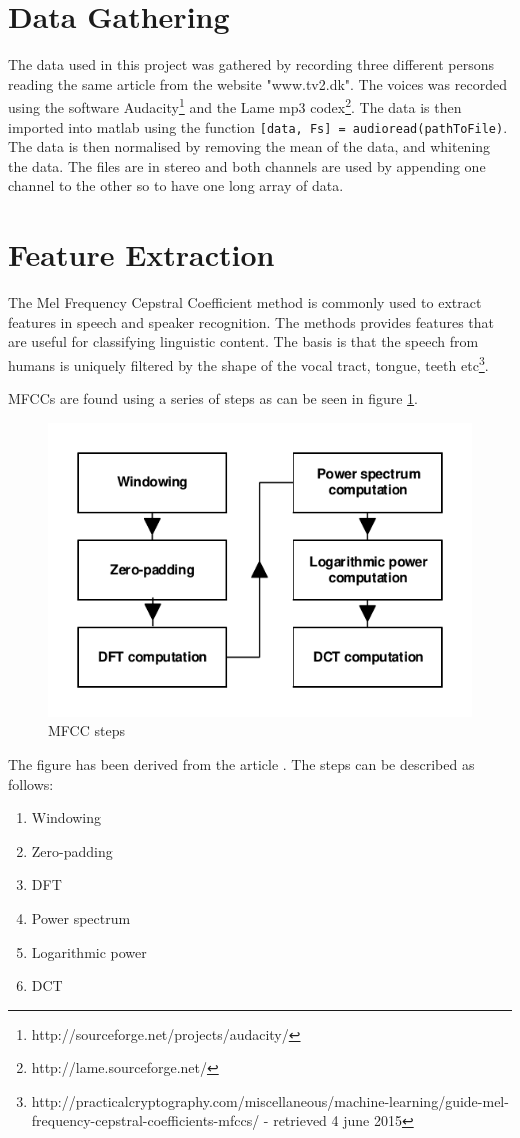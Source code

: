 \section{Data Gathering}
The data used in this project was gathered by recording three different persons reading the same article from the website "www.tv2.dk". The voices was recorded using the software Audacity\footnote{http://sourceforge.net/projects/audacity/} and the Lame mp3 codex\footnote{http://lame.sourceforge.net/}. The data is then imported into matlab using the function \texttt{[data, Fs] = audioread(pathToFile)}. The data is then normalised by removing the mean of the data, and whitening the data. The files are in stereo and both channels are used by appending one channel to the other so to have one long array of data.

\section{Feature Extraction}
The Mel Frequency Cepstral Coefficient method is commonly used to extract features in speech and speaker recognition. The methods provides features that are useful for classifying linguistic content. The basis is that the speech from humans is uniquely filtered by the shape of the vocal tract, tongue, teeth etc\footnote{http://practicalcryptography.com/miscellaneous/machine-learning/guide-mel-frequency-cepstral-coefficients-mfccs/ - retrieved 4 june 2015}. 

MFCCs are found using a series of steps as can be seen in figure \ref{fig:MFCCsteps}.
\begin{figure}[H]
\centering
\includegraphics[scale=1]{billeder/MFCCsteps}
\caption{MFCC steps}
\label{fig:MFCCsteps}
\end{figure}
The figure has been derived from the article \cite{Sahidullah2012}. The steps can be described as follows:
\begin{enumerate}
\item Windowing
\item Zero-padding
\item DFT
\item Power spectrum
\item Logarithmic power
\item DCT
\end{enumerate}

